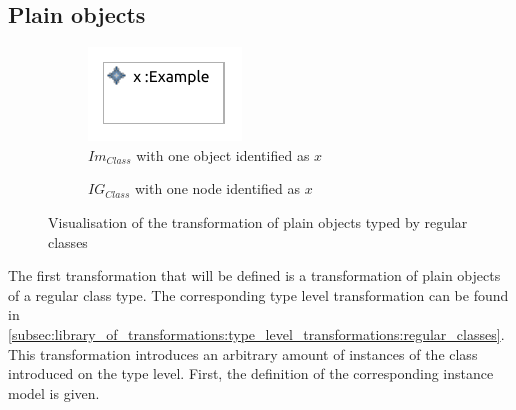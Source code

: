 \subsection{Plain objects}
\label{subsec:library_of_transformations:instance_level_transformations:plain_objects}

\begin{figure}[b]
    \centering
    \begin{subfigure}{0.45\textwidth}
        \centering
        \includegraphics{images/05_library_of_transformations/03_instance_level_transformations/01_plain_objects/class_instance.pdf}
        \caption{$Im_{Class}$ with one object identified as $x$}
        \label{fig:library_of_transformations:instance_level_transformations:plain_objects:visualisation:ecore}
    \end{subfigure}
    \begin{subfigure}{0.45\textwidth}
        \centering
        
        \caption{$IG_{Class}$ with one node identified as $x$}
        \label{fig:library_of_transformations:instance_level_transformations:plain_objects:visualisation:groove}
    \end{subfigure}
    \caption{Visualisation of the transformation of plain objects typed by regular classes}
    \label{fig:library_of_transformations:instance_level_transformations:plain_objects:visualisation}
\end{figure}

The first transformation that will be defined is a transformation of plain objects of a regular class type. The corresponding type level transformation can be found in \cref{subsec:library_of_transformations:type_level_transformations:regular_classes}. This transformation introduces an arbitrary amount of instances of the class introduced on the type level. First, the definition of the corresponding instance model is given.

